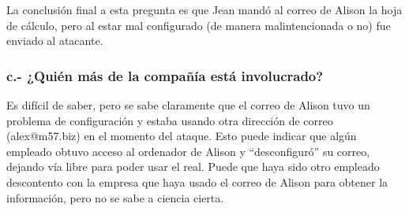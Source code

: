 \documentclass{article}
\begin{document}
La conclusión final a esta pregunta es que Jean mandó al correo de Alison la hoja de cálculo, pero al estar mal configurado (de manera malintencionada o no) fue enviado al atacante.

\subsubsection{c.- ¿Quién más de la compañía está involucrado?}

Es difícil de saber, pero se sabe claramente que el correo de Alison tuvo un problema de configuración y estaba usando otra dirección de correo (alex@m57.biz) en el momento del ataque. Esto puede indicar que algún empleado obtuvo acceso al ordenador de Alison y ``desconfiguró'' su correo, dejando vía libre para poder usar el real. Puede que haya sido otro empleado descontento con la empresa que haya usado el correo de Alison para obtener la información, pero no se sabe a ciencia cierta.
\end{document}
